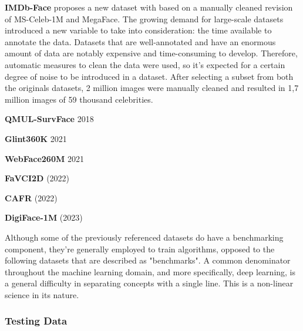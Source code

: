 \documentclass[class=report, crop=false, a4paper, 12pt]{standalone}
\begin{document}

\vspace{0.7\baselineskip}
\noindent\textbf{IMDb-Face} proposes a new dataset with based on a manually cleaned revision of MS-Celeb-1M and MegaFace. The growing demand for large-scale datasets introduced a new variable to take into consideration: the time available to annotate the data. Datasets that are well-annotated and have an enormous amount of data are notably expensive and time-consuming to develop. Therefore, automatic measures to clean the data were used, so it's expected for a certain degree of noise to be introduced in a dataset. After selecting a subset from both the originals datasets, 2 million images were manually cleaned and resulted in 1,7 million images of 59 thousand celebrities.

\vspace{0.7\baselineskip}
\noindent\textbf{QMUL-SurvFace} 2018

\vspace{0.7\baselineskip}
\noindent\textbf{Glint360K} 2021

\vspace{0.7\baselineskip}
\noindent\textbf{WebFace260M} 2021

\vspace{0.7\baselineskip}
\noindent\textbf{FaVCI2D} (2022)

\vspace{0.7\baselineskip}
\noindent\textbf{CAFR} (2022) \autocite{zhaoAgeInvariantFaceRecognition2022}

\vspace{0.7\baselineskip}
\noindent\textbf{DigiFace-1M} (2023)

\vspace{\baselineskip}
\par Although some of the previously referenced datasets do have a benchmarking component, they're generally employed to train algorithms, opposed to the following datasets that are described as "benchmarks". A common denominator throughout the machine learning domain, and more specifically, deep learning, is a general difficulty in separating concepts with a single line. This is a non-linear science in its nature.

\subsubsection{Testing Data}
\end{document}
